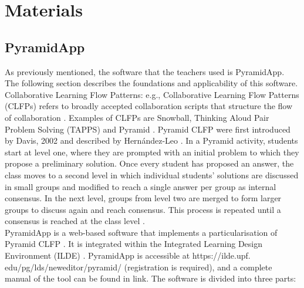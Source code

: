 \section{Materials}
\subsection{PyramidApp} \label{intro-pyramidapp}
As previously mentioned, the software that the teachers used is PyramidApp. The following section describes the foundations and applicability of this software.\\
Collaborative Learning Flow Patterns: e.g., Collaborative Learning Flow Patterns (CLFPs) refers to broadly accepted collaboration scripts that structure the flow of collaboration \cite{hernandez-leo_villasclaras-fernandez}. Examples of CLFPs are Snowball, Thinking Aloud Pair Problem Solving (TAPPS) and Pyramid \cite{Manathunga2018-uu}. Pyramid CLFP were first introduced by Davis, 2002 \cite{Davis_undated-sg} and described by Hernández-Leo \cite{Hernandez-leo2006-lv}. In a Pyramid activity, students start at level one, where they are prompted with an initial problem to which they propose a preliminary solution. Once every student has proposed an answer, the class moves to a second level in which individual students' solutions are discussed in small groups and modified to reach a single answer per group as internal consensus. In the next level, groups from level two are merged to form larger groups to discuss again and reach consensus. This process is repeated until a consensus is reached at the class level \cite{Manathunga2018-uu}.\\
PyramidApp is a web-based software that implements a particularisation of Pyramid CLFP \cite{Manathunga2018-uu}. It is integrated within the Integrated Learning Design Environment (ILDE) \cite{ILDE}. PyramidApp is accessible at https://ilde.upf. edu/pg/lds/neweditor/pyramid/ (registration is required), and a complete manual of the tool can be found in link. The software is divided into three parts:

